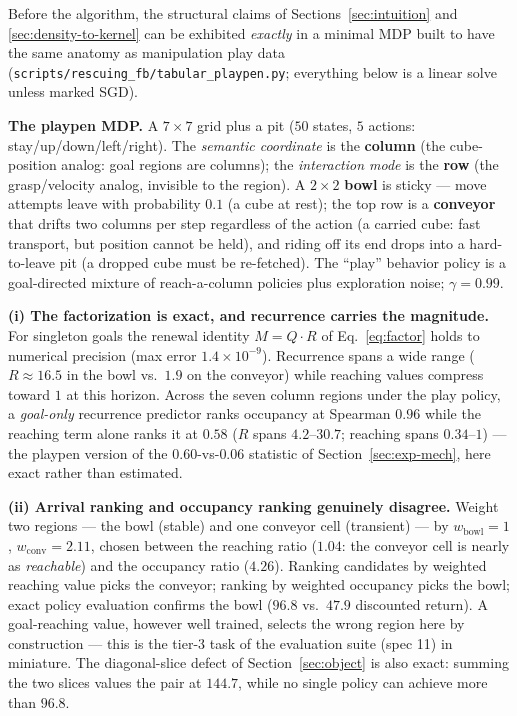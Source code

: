 \documentclass[10pt]{article}
\begin{document}
Before the algorithm, the structural claims of Sections~\ref{sec:intuition} and
\ref{sec:density-to-kernel} can be exhibited \emph{exactly} in a minimal MDP built to
have the same anatomy as manipulation play data
(\texttt{scripts/rescuing\_fb/tabular\_playpen.py}; everything below is a linear solve
unless marked SGD).

\textbf{The playpen MDP.} A $7\times7$ grid plus a pit ($50$ states, $5$ actions:
stay/up/down/left/right). The \emph{semantic coordinate} is the \textbf{column} (the
cube-position analog: goal regions are columns); the \emph{interaction mode} is the
\textbf{row} (the grasp/velocity analog, invisible to the region). A $2\times2$
\textbf{bowl} is sticky --- move attempts leave with probability $0.1$ (a cube at
rest); the top row is a \textbf{conveyor} that drifts two columns per step regardless
of the action (a carried cube: fast transport, but position cannot be held), and
riding off its end drops into a hard-to-leave pit (a dropped cube must be re-fetched).
The ``play'' behavior policy is a goal-directed mixture of reach-a-column policies
plus exploration noise; $\gamma=0.99$.

\textbf{(i) The factorization is exact, and recurrence carries the magnitude.}
For singleton goals the renewal identity $M=Q\cdot R$ of Eq.~\ref{eq:factor} holds to
numerical precision (max error $1.4\times10^{-9}$). Recurrence spans a wide range
($R\approx16.5$ in the bowl vs.\ $1.9$ on the conveyor) while reaching values compress
toward $1$ at this horizon. Across the seven column regions under the play policy, a
\emph{goal-only} recurrence predictor ranks occupancy at Spearman $\mathbf{0.96}$
while the reaching term alone ranks it at $0.58$ ($R$ spans $4.2$--$30.7$; reaching
spans $0.34$--$1$) --- the playpen version of the $0.60$-vs-$0.06$ statistic of
Section~\ref{sec:exp-mech}, here exact rather than estimated.

\textbf{(ii) Arrival ranking and occupancy ranking genuinely disagree.}
Weight two regions --- the bowl (stable) and one conveyor cell (transient) --- by
$w_{\mathrm{bowl}}{=}1$, $w_{\mathrm{conv}}{=}2.11$, chosen between the reaching ratio
($1.04$: the conveyor cell is nearly as \emph{reachable}) and the occupancy ratio
($4.26$). Ranking candidates by weighted reaching value picks the conveyor; ranking by
weighted occupancy picks the bowl; exact policy evaluation confirms the bowl
($96.8$ vs.\ $47.9$ discounted return). A goal-reaching value, however well trained,
selects the wrong region here by construction --- this is the tier-3 task of the
evaluation suite (spec 11) in miniature. The diagonal-slice defect of
Section~\ref{sec:object} is also exact: summing the two slices values the pair at
$144.7$, while no single policy can achieve more than $96.8$.
\end{document}
